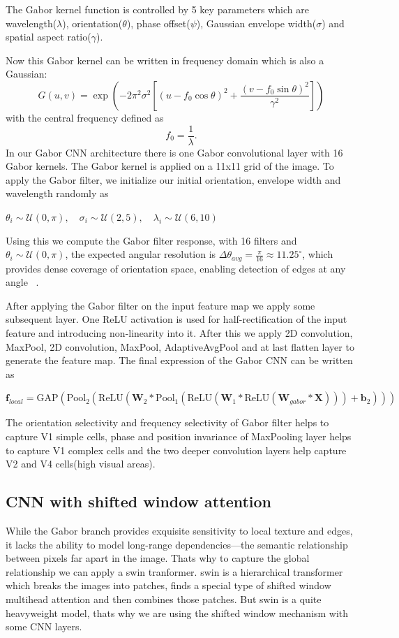 \documentclass[preprint,12pt]{elsarticle}
\begin{document}
The Gabor kernel function is controlled by 5 key parameters which are wavelength($\lambda$), orientation($\theta$), phase offset($\psi$), Gaussian envelope width($\sigma$) and spatial aspect ratio($\gamma$).

Now this Gabor kernel can be written in frequency domain which is also a Gaussian:
\[
G(u, v)
=
\exp\!\left(
- 2 \pi^2 \sigma^2
\left[
(u - f_0 \cos\theta)^2
+ \frac{(v - f_0 \sin\theta)^2}{\gamma^2}
\right]
\right)
\]
with the central frequency defined as
\[
f_0 = \frac{1}{\lambda}.
\]
In our Gabor CNN architecture there is one Gabor convolutional layer with 16 Gabor kernels. The Gabor kernel is applied on a 11x11 grid of the image. To apply the Gabor filter, we initialize our initial orientation, envelope width and wavelength randomly as 

$\theta_i \sim \mathcal{U}(0, \pi), \quad
 \sigma_i \sim \mathcal{U}(2, 5), \quad
 \lambda_i \sim \mathcal{U}(6, 10)$

Using this we compute the Gabor filter response, with 16 filters and $\theta_i \sim \mathcal{U}(0, \pi)$, the expected angular resolution is
$\Delta \theta_{avg} = \frac{\pi}{16} \approx 11.25^\circ$, which provides dense coverage of orientation space, enabling detection of edges at any angle ~\cite{b2}.

After applying the Gabor filter on the input feature map we apply some subsequent layer. One ReLU activation is used for half-rectification of the input feature and introducing non-linearity into it. After this we apply 2D convolution, MaxPool, 2D convolution, MaxPool, AdaptiveAvgPool and at last flatten layer to generate the feature map. The final expression of the Gabor CNN can be written as

$\mathbf{f}_{local}
= \mathrm{GAP}(\mathrm{Pool}_2(\mathrm{ReLU}(\mathbf{W}_2 * \mathrm{Pool}_1(\mathrm{ReLU}(\mathbf{W}_1 * \mathrm{ReLU}(\mathbf{W}_{gabor} * \mathbf{X}))) + \mathbf{b}_2)))$

The orientation selectivity and frequency selectivity of Gabor filter helps to capture V1 simple cells, phase and position invariance of MaxPooling layer helps to capture V1 complex cells and the two deeper convolution layers help capture V2 and V4 cells(high visual areas). ~\cite{b3}


\subsection{CNN with shifted window attention}

While the Gabor branch provides exquisite sensitivity to local texture and edges, it lacks the ability to model long-range dependencies—the semantic relationship between pixels far apart in the image. Thats why to capture the global relationship we can apply a swin tranformer. swin is a hierarchical transformer which breaks the images into patches, finds a special type of shifted window multihead attention and then combines those patches. But swin is a quite heavyweight model, thats why we are using the shifted window mechanism with some CNN layers. 
\end{document}
